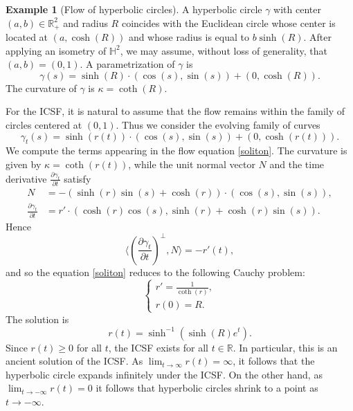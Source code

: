 \documentclass[12pt]{amsart}
\theoremstyle{plain}
\theoremstyle{definition}
\newtheorem{example}[theorem]{Example}
\def\h{\mathbb H}
\def\r{\mathbb R}
\begin{document}
\begin{example}[Flow of hyperbolic circles]
\label{ex:circle}
A hyperbolic circle $\gamma$ with center $(a,b) \in \r^2_+$ and radius $R$ coincides with the Euclidean circle whose center is located at $(a, \cosh(R))$ and whose radius is equal to $b\sinh(R)$. After applying an isometry of $\h^2$, we may assume, without loss of generality, that $(a,b)=(0,1)$. A parametrization of $\gamma$ is 
$$\gamma(s)=\sinh(R) \cdot (\cos(s),\sin(s)) + (0,\cosh(R)).$$
The curvature of $\gamma$ is $\kappa=\coth(R)$.

For the ICSF, it is natural to assume that the flow remains within the family of circles centered at $(0,1)$. Thus we consider the evolving family of curves
$$\gamma_t(s) = \sinh(r(t)) \cdot (\cos(s), \sin(s)) + (0,\cosh(r(t))).$$ 
We compute the terms appearing in the flow equation \eqref{soliton}. The curvature is given by $\kappa=\coth(r(t))$, while the unit normal vector $N$ and the time derivative $ \frac{\partial \gamma_t}{\partial t}$ satisfy
\begin{equation*}
\begin{split}
N &=- (\sinh(r)\sin(s) + \cosh(r)) \cdot (\cos(s),\sin(s)),\\
\frac{\partial \gamma_t}{\partial t} &= r' \cdot (\cosh(r)\cos(s),\sinh(r)+\cosh(r)\sin(s)).
\end{split}
\end{equation*}
Hence 
$$  \langle\left(\frac{\partial \gamma_t}{\partial t}\right)^\perp, N \rangle = -r'(t),$$
and so the equation \eqref{soliton} reduces to the following Cauchy problem:
\begin{equation*}
\begin{cases}
\displaystyle r' =  \frac{1}{\coth(r)}, \\
r(0) = R.
\end{cases}
\end{equation*}
The solution is $$r(t) = \sinh^{-1}(\sinh(R)e^{t}).$$
Since $r(t)\geq 0$ for all $t$, the ICSF exists for all $t \in \r $. In particular, this is an ancient solution of the ICSF. As $\lim_{t \to \infty} r(t) = \infty$, it follows that the hyperbolic circle expands infinitely under the ICSF. On the other hand, as $\lim_{t \to - \infty} r(t) = 0$ it follows that hyperbolic circles shrink to a point as $t \to -\infty$.
\end{example} 
\end{document}
